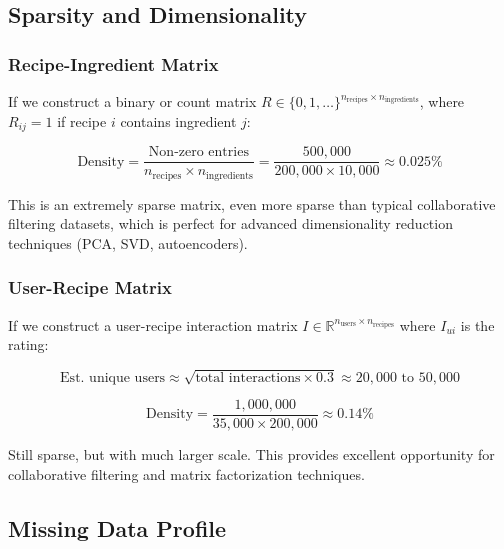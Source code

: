 \documentclass[11pt,a4paper]{article}
\begin{document}
\subsection{Sparsity and Dimensionality}

\subsubsection{Recipe-Ingredient Matrix}

If we construct a binary or count matrix $R \in \{0, 1, \ldots\}^{n_{\text{recipes}} \times n_{\text{ingredients}}}$, where $R_{ij} = 1$ if recipe $i$ contains ingredient $j$:

\begin{equation}
\text{Density} = \frac{\text{Non-zero entries}}{n_{\text{recipes}} \times n_{\text{ingredients}}} = \frac{500,000}{200,000 \times 10,000} \approx 0.025\%
\end{equation}

This is an extremely sparse matrix, even more sparse than typical collaborative filtering datasets, which is perfect for advanced dimensionality reduction techniques (PCA, SVD, autoencoders).

\subsubsection{User-Recipe Matrix}

If we construct a user-recipe interaction matrix $I \in \mathbb{R}^{n_{\text{users}} \times n_{\text{recipes}}}$ where $I_{ui}$ is the rating:

\begin{equation}
\text{Est. unique users} \approx \sqrt{\text{total interactions} \times 0.3} \approx 20,000 \text{ to } 50,000
\end{equation}

\begin{equation}
\text{Density} = \frac{1,000,000}{35,000 \times 200,000} \approx 0.14\%
\end{equation}

Still sparse, but with much larger scale. This provides excellent opportunity for collaborative filtering and matrix factorization techniques.

\subsection{Missing Data Profile}
\end{document}
